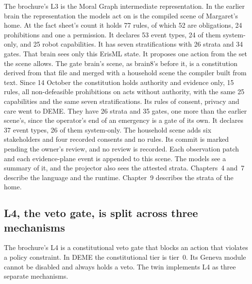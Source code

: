 The brochure's L3 is the Moral Graph intermediate representation.
In the earlier brain the representation the models act on is the compiled scene of Margaret's
home. At the fact sheet's count it holds 77 rules, of which 52 are obligations, 24 prohibitions and
one a permission. It declares 53 event types, 24 of them system-only, and 25 robot capabilities.
It has seven stratifications with 26 strata and 34 gates.
That brain sees only this ErisML state. It proposes one action from the set the scene allows.
The gate brain's scene, as brain8's before it, is a constitution derived from that file and merged
with a household scene the compiler built from text. Since 14 October the constitution holds
authority and evidence only, 15 rules, all non-defeasible prohibitions on acts without authority,
with the same 25 capabilities and the same seven stratifications. Its rules of consent, privacy and
care went to DEME. They have 26 strata and 35 gates, one more than the earlier scene's, since the
operator's end of an emergency is a gate of its own. It declares 37 event types, 26 of them
system-only. The household scene adds six stakeholders and four recorded consents and no rules.
Its commit is marked pending the owner's review, and no review is recorded.
Each observation patch and each evidence-plane event is appended to this scene. The models see a
summary of it, and the projector also sees the attested strata.
Chapters~4 and~7 describe the language and the runtime. Chapter~9 describes the strata of the
home.

\subsection*{L4, the veto gate, is split across three mechanisms}

The brochure's L4 is a constitutional veto gate that blocks an action that violates a policy
constraint.
In DEME the constitutional tier is tier~0. Its Geneva module cannot be disabled and always holds a
veto.
The twin implements L4 as three separate mechanisms.

